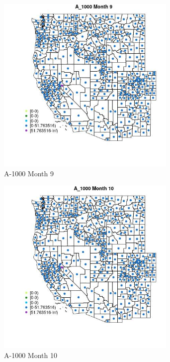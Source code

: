 \begin{figure} 
\centering  
\includegraphics[width=0.77\textwidth]{Code_Outputs/df_report_ML_predictors_CountyCentroid_Locations_Dates_2008-01-01to2018-12-31_MapObsMo9A_1000.jpg} 
\caption{\label{fig:df_report_ML_predictors_CountyCentroid_Locations_Dates_2008-01-01to2018-12-31MapObsMo9A_1000}A-1000 Month 9} 
\end{figure} 
 

\begin{figure} 
\centering  
\includegraphics[width=0.77\textwidth]{Code_Outputs/df_report_ML_predictors_CountyCentroid_Locations_Dates_2008-01-01to2018-12-31_MapObsMo10A_1000.jpg} 
\caption{\label{fig:df_report_ML_predictors_CountyCentroid_Locations_Dates_2008-01-01to2018-12-31MapObsMo10A_1000}A-1000 Month 10} 
\end{figure} 
 

